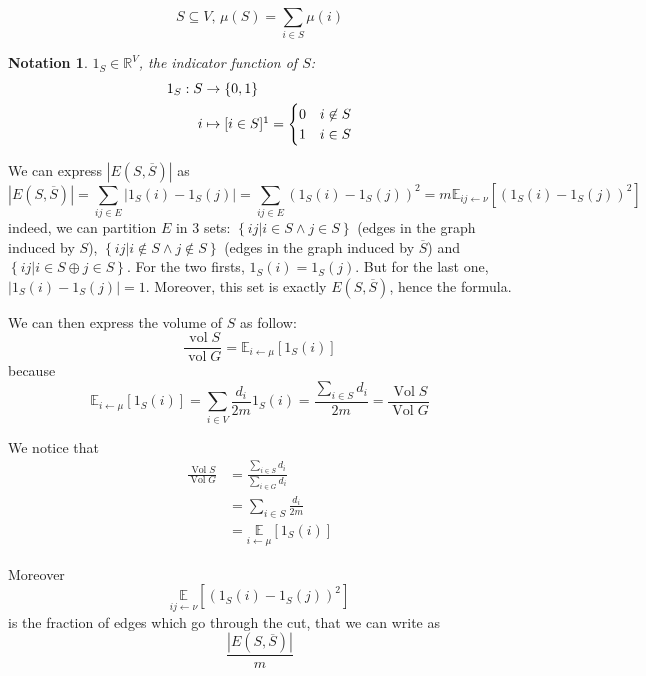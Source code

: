 \documentclass[12pt]{article}
\newtheorem{notation}{Notation}
\newcommand{\EE}{\mathbb{E}}
\newcommand{\RR}{\mathbb{R}}
\newcommand{\set}[1]{\left\{ #1 \right\}}
\newcommand{\la}{\leftarrow}
\newcommand{\opname}[1]{\operatorname{#1}}
\newcommand{\card}[1]{\left\lvert#1\right\rvert}
\newcommand{\esp}[2][]{\underset{#1}{\EE}\left[ #2 \right]}
\DeclareMathOperator{\vol}{Vol}
\begin{document}
\[
    S\subseteq V,\, \mu(S) = \sum\limits_{i\in S} \mu(i)
\]

\begin{notation}
    $1_S \in \RR^V$, the indicator function of $S$:
    \[
        \begin{aligned}
            1_S: S &\to \set{0,1}\\
            i &\mapsto [i\in S]\footnotemark
            = \begin{cases}
                    0 & i\not\in S\\
                    1 & i\in S
                \end{cases}     
        \end{aligned}
    \]
\end{notation}

We can express $\card{E(S,\overline{S})}$ as
\[
    \card{E(S,\overline{S})} = \sum\limits_{ij\in E} \lvert 1_S(i)-1_S(j)\rvert = \sum\limits_{ij\in E} \left( 1_S(i)-1_S(j)\right)^2 = m \EE_{ij \leftarrow \nu} \left[ \left( 1_S(i)-1_S(j)\right)^2 \right]
\]
indeed, we can partition $E$ in 3 sets: $\set{ij \vert i\in S \wedge j \in S}$ (edges in the graph induced by $S$), $\set{ij \vert i\not\in S \wedge j \not\in S}$ (edges in the graph induced by $\overline{S}$) and $\set{ij \vert i\in S \oplus j \in S}$. For the two firsts, $1_S(i) = 1_S(j)$. But for the last one, $\lvert 1_S(i) - 1_S(j)\rvert = 1$. Moreover, this set is exactly $E(S,\overline{S})$, hence the formula.

We can then express the volume of $S$ as follow:
\[
    \frac{\opname{vol} S}{\opname{vol} G} = \EE_{i \leftarrow \mu} \left[  1_S(i)\right]
\]
because
\[
    \EE_{i \leftarrow \mu} \left[  1_S(i)\right] = \sum_{i\in V} \frac {d_i} {2m} 1_S(i) = \frac { \sum_{i\in S} d_i} {2m} = \frac {\vol S} {\vol G}
\]

We notice that
\[
    \begin{aligned}
        \frac{\vol S}{\vol G} &= \frac{\sum\limits_{i\in S} d_i}{\sum\limits_{i\in G} d_i}\\
        &= \sum\limits_{i\in S}\frac{d_i}{2m}\\
        &= \esp[i\la\mu]{1_S(i)}
    \end{aligned}
\]

Moreover
\[
    \esp[ij\la\nu]{(1_S(i)-1_S(j))^2}
\]
is the fraction of edges which go through the cut, that we can write as
\[
    \frac{\card{E(S,\overline{S})}}{m}
\]
\end{document}

